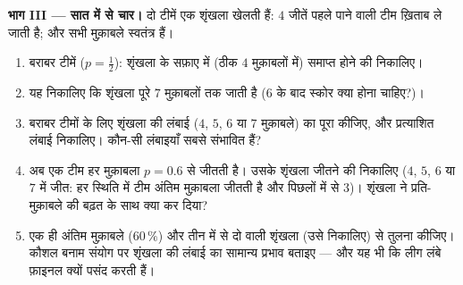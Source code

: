 \begin{problem}
\medskip
\noindent\textbf{भाग III --- सात में से चार।}
दो टीमें एक शृंखला खेलती हैं: $4$ जीतें पहले पाने वाली टीम ख़िताब ले जाती
है; और सभी मुक़ाबले स्वतंत्र हैं।
\begin{enumerate}[resume]
  \item बराबर टीमें ($p = \frac12$): शृंखला के सफ़ाए में (ठीक $4$ मुक़ाबलों में)
        समाप्त होने की  निकालिए।
  \item यह  निकालिए कि शृंखला पूरे $7$ मुक़ाबलों तक जाती है ($6$
        के बाद स्कोर क्या होना चाहिए?)।
  \item बराबर टीमों के लिए शृंखला की लंबाई ($4$, $5$, $6$ या $7$
        मुक़ाबले) का  पूरा कीजिए, और प्रत्याशित लंबाई निकालिए। कौन-सी
        लंबाइयाँ सबसे संभावित हैं?
  \item अब एक टीम हर मुक़ाबला $p = 0.6$ से जीतती है। उसके शृंखला जीतने की
         निकालिए ($4$, $5$, $6$ या $7$ में जीत: हर स्थिति
        में टीम अंतिम मुक़ाबला जीतती है और पिछलों में से $3$)। शृंखला ने
        प्रति-मुक़ाबले की बढ़त के साथ क्या कर दिया?
  \item एक ही अंतिम मुक़ाबले ($60\,\%$) और तीन में से दो वाली शृंखला (उसे
        निकालिए) से तुलना कीजिए। कौशल बनाम संयोग पर शृंखला की लंबाई का
        सामान्य प्रभाव बताइए --- और यह भी कि लीग लंबे फ़ाइनल क्यों पसंद
        करती हैं।
\end{enumerate}


\end{problem}
